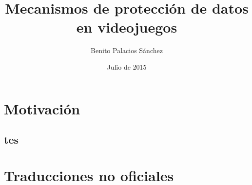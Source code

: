 \documentclass{beamer}
\title{Mecanismos de protección de datos en videojuegos}
\author{Benito Palacios Sánchez}
\institute
{Escuela Técnica Superior de Ingenierías Informática y Telecomunicación\\
  Universidad de Granada
}
\date{Julio de 2015}
\begin{document}
    \frame{\titlepage}


    \section{Motivación}
    \subsection{tes}

    \section{Traducciones no oficiales}
\end{document}
